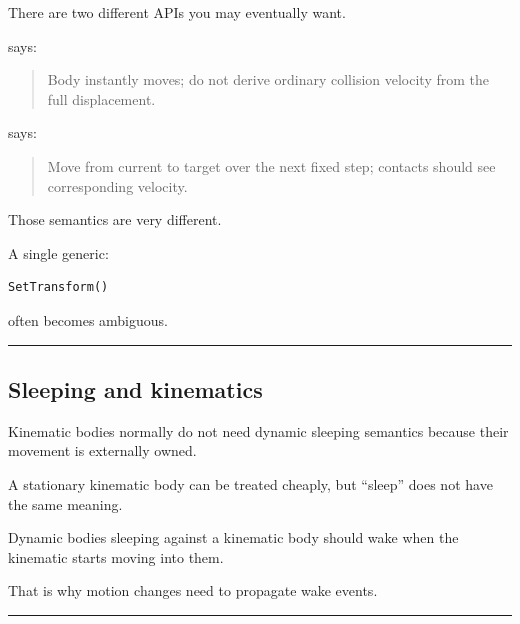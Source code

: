 \hypertarget{06-engine-ii-ch038-kinematic-teleport-versus-kinematic-sweep}{}

There are two different APIs you may eventually want.

 says:

\begin{quote}
Body instantly moves; do not derive ordinary collision velocity from the full displacement.
\end{quote}

 says:

\begin{quote}
Move from current to target over the next fixed step; contacts should see corresponding velocity.
\end{quote}

Those semantics are very different.

A single generic:

\begin{verbatim}
SetTransform()
\end{verbatim}

often becomes ambiguous.

\begin{center}\rule{0.5\linewidth}{0.5pt}\end{center}

\subsection{Sleeping and kinematics}\label{06-engine-ii-ch038-sleeping-and-kinematics}

\hypertarget{06-engine-ii-ch038-sleeping-and-kinematics}{}

Kinematic bodies normally do not need dynamic sleeping semantics because their movement is externally owned.

A stationary kinematic body can be treated cheaply, but ``sleep'' does not have the same meaning.

Dynamic bodies sleeping against a kinematic body should wake when the kinematic starts moving into them.

That is why motion changes need to propagate wake events.

\begin{center}\rule{0.5\linewidth}{0.5pt}\end{center}

